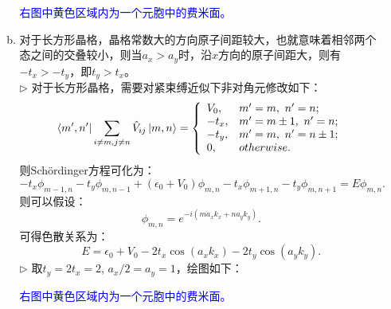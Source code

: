 \documentclass[reqno,a4paper,12pt]{amsart}
\begin{document}
\begin{enumerate}[1.]
\begin{tcolorbox}[breakable, colback = black!5!white, colframe = black]
\begin{enumerate}[(a)]
\begin{figure}[H]
	\caption{}
\end{figure}
\textcolor{blue}{右图中黄色区域内为一个元胞中的费米面。}

\item 对于长方形晶格，晶格常数大的方向原子间距较大，也就意味着相邻两个态之间的交叠较小，则当$a_x>a_y$时，沿$x$方向的原子间距大，则有$-t_x>-t_y$，即$t_y>t_x$。 \\
$\triangleright$ 对于长方形晶格，需要对紧束缚近似下非对角元修改如下：
\[
	\bra{m',n'} \sum_{i\neq m, j\neq n}\hat{V}_{ij} \ket{m,n} = \left\{ \begin{array}{ll}
		V_0, & m' = m,~n'=n; \\
		-t_x, & m' = m\pm 1, ~ n' = n; \\
		-t_y, & m' = m, ~ n' = n \pm 1; \\
		0, & otherwise.
	\end{array} \right.
\]
则Sch\"ordinger方程可化为：
\[
	-t_x\phi_{m-1,n} - t_y\phi_{m,n-1} + (\epsilon_0+V_0)\phi_{m,n} - t_x\phi_{m+1,n} - t_y\phi_{m,n+1} = E\phi_{m,n}.
\]
则可以假设：
\[
	\phi_{m,n} = e^{-i(ma_xk_x + na_yk_y)}.
\]
可得色散关系为：
\[
	E = \epsilon_0+V_0 - 2t_x\cos(a_xk_x) - 2t_y\cos(a_yk_y).
\]
$\triangleright$ 取$t_y = 2t_x = 2$, $a_x/2 = a_y = 1$，绘图如下：
\begin{figure}[H]
	\centering
	 \hspace{2em} 
	\caption{}
\end{figure}
\textcolor{blue}{右图中黄色区域内为一个元胞中的费米面。}


\end{enumerate}
\end{tcolorbox}
\end{enumerate}
\end{document}
